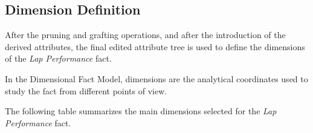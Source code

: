 \documentclass[a4paper,11pt]{article}
\begin{document}
	
	
	\subsection{Dimension Definition}
	
	After the pruning and grafting operations, and after the introduction of the derived
	attributes, the final edited attribute tree is used to define the dimensions of the
	\textit{Lap Performance} fact.
	
	In the Dimensional Fact Model, dimensions are the analytical coordinates used to
	study the fact from different points of view. 
	
	The following table summarizes the main dimensions selected for the
	\textit{Lap Performance} fact.
	
\end{document}
